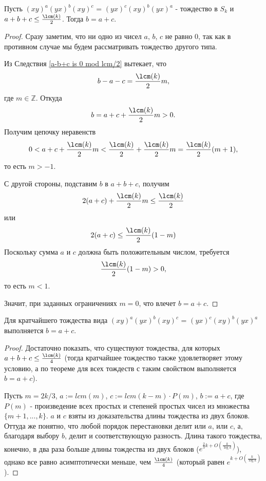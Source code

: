 	\begin{theorem}\label{b is a plus c}
		Пусть $(xy)^a(yx)^b(xy)^c$ = $(yx)^c(xy)^b(yx)^a$ - тождество в $S_k$ и $a + b + c \le \frac{\lcm(k)}{2}$. Тогда $b = a+c$.
	\end{theorem}
	\begin{proof}
		Сразу заметим, что ни одно из чисел $a$, $b$, $c$ не равно 0, так как в противном случае мы будем рассматривать тождество другого типа.
		
		Из Следствия \ref{a-b+c is 0 mod lcm/2} вытекает, что \hspace{5pt} 
		$$
			b - a - c = \frac{\lcm(k)}{2}m,
		$$ где $m \in \mathbb{Z}$. 
		Откуда
		$$
			b = a + c + \frac{\lcm(k)}{2}m > 0.
		$$
		Получим цепочку неравенств 
		$$
			0 < a + c + \frac{\lcm(k)}{2}m < \frac{\lcm(k)}{2} + \frac{\lcm(k)}{2}m = \frac{\lcm(k)}{2}(m + 1),
		$$то есть $m > -1$.
		
		С другой стороны, подставим $b$ в $a+b+c$, получим
		$$
			2(a + c) + \frac{\lcm(k)}{2}m \le \frac{\lcm(k)}{2}
		$$ или 
		$$
			2(a + c) \le \frac{\lcm(k)}{2}(1-m)
		$$
		Поскольку сумма $a$ и $c$ должна быть положительным числом, требуется
		$$
			\frac{\lcm(k)}{2}(1-m) > 0,
		$$ то есть $m < 1$.
		
		Значит, при заданных ограничениях $m = 0$, что влечет $b = a + c$.
	\end{proof}

	\begin{corollary}
		Для кратчайшего тождества вида $(xy)^a(yx)^b(xy)^c$ = $(yx)^c(xy)^b(yx)^a$ выполняется $b = a + c$.
	\end{corollary}
	\begin{proof}
		Достаточно показать, что существуют тождества, для которых $a + b + c \le \frac{\lcm(k)}{4}$ (тогда кратчайшее тождество также удовлетворяет этому условию, а по теореме для всех тождеств с таким свойством выполняется $b = a + c$).
		
		Пусть $m = 2k/3$, $a := lcm(m)$, $c := lcm(k - m) \cdot P(m)$, $b := a+c$, где $P(m)$ - произведение всех простых и степеней простых чисел из множества $\{m+1, ..., k\}$. $a$ и $c$ взяты из доказательства длины тождества из двух блоков. Оттуда же понятно, что любой порядок перестановки делит или $a$, или $c$, а, благодаря выбору $b$, делит и соответствующую разность. Длина такого тождества, конечно, в два раза больше длины тождества из двух блоков ($e^{\frac{2}{3}k + O(\frac{k}{\log k})}$), однако все равно асимптотически меньше, чем $\frac{\lcm(k)}{4}$ (который  равен $e^{k + O(\frac{k}{\log k})}$).
	\end{proof}

